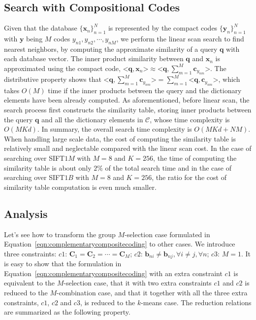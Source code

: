 \documentclass[10pt, letterpaper]{article}
\begin{document}
\subsection{Search with Compositional Codes}\label{subsection:searchwithcc}
Given that the database $\{\mathbf{x}_n\}_{n=1}^N$
is represented by the compact codes
$\{\mathbf{y}_n\}_{n=1}^N$
with $\mathbf{y}$ being $M$ codes
$y_{n1}, y_{n2}, \cdots, y_{nM}$,
we perform the linear scan search to find nearest neighbors,
by computing the approximate similarity
of a query $\mathbf{q}$
with each database vector.
The inner product similarity between $\mathbf{q}$ and $\mathbf{x}_n$
is approximated using the compact code,
$\texttt{<}\mathbf{q}, \mathbf{x}_n\texttt{>} \approx
\texttt{<}\mathbf{q}, \sum_{m=1}^M \mathbf{c}_{y_{nm}}\texttt{>}$.
The distributive property shows that
$\texttt{<}\mathbf{q}, \sum_{m=1}^M \mathbf{c}_{y_{nm}}\texttt{>}
= \sum_{m=1}^M \texttt{<}\mathbf{q}, \mathbf{c}_{y_{nm}}\texttt{>}$,
which takes $O(M)$ time
if the inner products between the query and the dictionary elements
have been already computed.
As aforementioned, before linear scan,
the search process first constructs the similarity table,
storing inner products between the query $\mathbf{q}$
and all the dictionary elements in $\mathcal{C}$, whose time complexity is $O(MKd)$.
In summary, the overall search time complexity is
$O(MKd + NM)$.
When handling large scale data,
the cost of computing the similarity table is relatively small
and neglectable compared with the linear scan cost.
In the case of searching over SIFT$1M$ with $M=8$ and $K=256$,
the time of computing the similarity table is about only $2\%$
of the total search time
and in the case of searching over SIFT$1B$ with $M=8$ and $K=256$,
the ratio for the cost of similarity table computation is even much smaller.


\subsection{Analysis}
Let's see how to transform the group $M$-selection case
formulated in Equation~\ref{eqn:complementarycompositecoding}
to other cases.
We introduce three constraints:
$c1$: $\mathbf{C}_1=\mathbf{C}_2=\cdots = \mathbf{C}_M$;
$c2$: $\mathbf{b}_{ni} \neq \mathbf{b}_{nj}, \forall i \neq j, \forall n$;
$c3$: $M=1$.
It is easy to show that
the formulation in Equation~\ref{eqn:complementarycompositecoding}
with an extra constraint $c1$
is equivalent to the $M$-selection case,
that it with two extra constraints $c1$ and $c2$ is reduced to
the $M$-combination case,
and that it together with all the three extra constraints,
$c1$, $c2$ and $c3$,
is reduced to the $k$-means case.
The reduction relations are summarized
as the following property.
\end{document}
